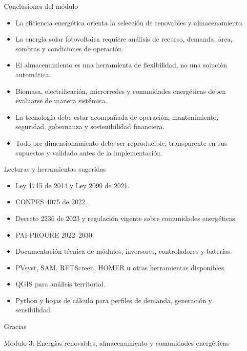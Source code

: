 \documentclass[aspectratio=169,10pt]{beamer}
\begin{document}
\begin{frame}{Conclusiones del módulo}
\begin{itemize}
    \item La eficiencia energética orienta la selección de renovables y almacenamiento.
    \item La energía solar fotovoltaica requiere análisis de recurso, demanda, área, sombras y condiciones de operación.
    \item El almacenamiento es una herramienta de flexibilidad, no una solución automática.
    \item Biomasa, electrificación, microrredes y comunidades energéticas deben evaluarse de manera sistémica.
    \item La tecnología debe estar acompañada de operación, mantenimiento, seguridad, gobernanza y sostenibilidad financiera.
    \item Todo pre-dimensionamiento debe ser reproducible, transparente en sus supuestos y validado antes de la implementación.
\end{itemize}
\end{frame}

\begin{frame}{Lecturas y herramientas sugeridas}
\begin{itemize}
    \item Ley 1715 de 2014 y Ley 2099 de 2021.
    \item CONPES 4075 de 2022.
    \item Decreto 2236 de 2023 y regulación vigente sobre comunidades energéticas.
    \item PAI-PROURE 2022--2030.
    \item Documentación técnica de módulos, inversores, controladores y baterías.
    \item PVsyst, SAM, RETScreen, HOMER u otras herramientas disponibles.
    \item QGIS para análisis territorial.
    \item Python y hojas de cálculo para perfiles de demanda, generación y sensibilidad.
\end{itemize}
\end{frame}

\begin{frame}
\centering
\vfill

{\LARGE \textcolor{AzulInstitucional}{Gracias}}

\vspace{0.5cm}

{\large Módulo 3: Energías renovables, almacenamiento y comunidades energéticas}

\vfill
\end{frame}
\end{document}
